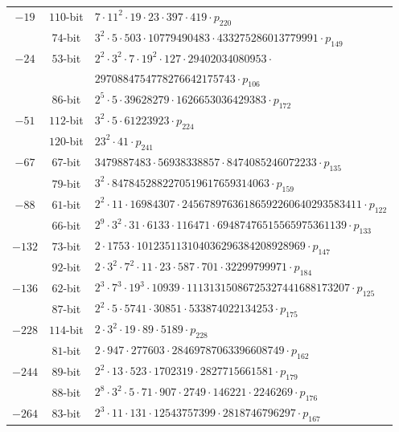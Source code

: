 \documentclass[smallextended]{svjour3}
\begin{document}
\begin{table}[!ht]
\begin{tabularx}{\textwidth}{ccl}
$-19$ & $110$-bit & $7  \cdot 11^{2}  \cdot 19  \cdot 23  \cdot 397  \cdot 419  \cdot p_{220}$\\
 & $74$-bit & $3^{2}  \cdot 5  \cdot 503  \cdot 10779490483  \cdot 433275286013779991  \cdot p_{149}$\\
$-24$ & $53$-bit & $2^{2}  \cdot 3^{2}  \cdot 7  \cdot 19^{2}  \cdot 127  \cdot 29402034080953  \cdot$\\
      &          & $2970884754778276642175743  \cdot p_{106}$\\
 & $86$-bit & $2^{5}  \cdot 5  \cdot 39628279  \cdot 1626653036429383  \cdot p_{172}$\\
$-51$ & $112$-bit & $3^{2}  \cdot 5  \cdot 61223923  \cdot p_{224}$\\
 & $120$-bit & $23^{2}  \cdot 41  \cdot p_{241}$\\
$-67$ & $67$-bit & $3479887483  \cdot 56938338857  \cdot 8474085246072233  \cdot p_{135}$\\
 & $79$-bit & $3^{2}  \cdot 8478452882270519617659314063  \cdot p_{159}$\\
$-88$ & $61$-bit & $2^{2}  \cdot 11  \cdot 16984307  \cdot 24567897636186592260640293583411  \cdot p_{122}$\\
 & $66$-bit & $2^{9}  \cdot 3^{2}  \cdot 31  \cdot 6133  \cdot 116471  \cdot 69487476515565975361139  \cdot p_{133}$\\
$-132$ & $73$-bit & $2  \cdot 1753  \cdot 101235113104036296384208928969  \cdot p_{147}$\\
 & $92$-bit & $2  \cdot 3^{2}  \cdot 7^{2}  \cdot 11  \cdot 23  \cdot 587  \cdot 701  \cdot 32299799971  \cdot p_{184}$\\
$-136$ & $62$-bit & $2^{3}  \cdot 7^{3}  \cdot 19^{3}  \cdot 10939  \cdot 11131315086725327441688173207  \cdot p_{125}$\\
 & $87$-bit & $2^{2}  \cdot 5  \cdot 5741  \cdot 30851  \cdot 533874022134253  \cdot p_{175}$\\
$-228$ & $114$-bit & $2  \cdot 3^{2}  \cdot 19  \cdot 89  \cdot 5189  \cdot p_{228}$\\
 & $81$-bit & $2  \cdot 947  \cdot 277603  \cdot 28469787063396608749  \cdot p_{162}$\\
$-244$ & $89$-bit & $2^{2}  \cdot 13  \cdot 523  \cdot 1702319  \cdot 2827715661581  \cdot p_{179}$\\
 & $88$-bit & $2^{8}  \cdot 3^{2}  \cdot 5  \cdot 71  \cdot 907  \cdot 2749  \cdot 146221  \cdot 2246269  \cdot p_{176}$\\
$-264$ & $83$-bit & $2^{3}  \cdot 11  \cdot 131  \cdot 12543757399  \cdot 2818746796297  \cdot p_{167}$\\

\end{tabularx}
\end{table}
\end{document}
